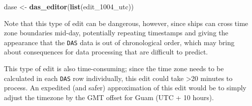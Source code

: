 \documentclass[
]{book}
\newenvironment{Shaded}{\begin{snugshade}}{\end{snugshade}}
\newcommand{\DecValTok}[1]{\textcolor[rgb]{0.00,0.00,0.81}{#1}}
\newcommand{\KeywordTok}[1]{\textcolor[rgb]{0.13,0.29,0.53}{\textbf{#1}}}
\newcommand{\NormalTok}[1]{#1}
\newcommand{\OperatorTok}[1]{\textcolor[rgb]{0.81,0.36,0.00}{\textbf{#1}}}
\newcommand{\StringTok}[1]{\textcolor[rgb]{0.31,0.60,0.02}{#1}}
\begin{document}
\begin{Shaded}
\begin{Highlighting}[]
\NormalTok{dase <-}\StringTok{ }\KeywordTok{das_editor}\NormalTok{(}\KeywordTok{list}\NormalTok{(edit_}\DecValTok{1004}\NormalTok{_utc))}
\end{Highlighting}
\end{Shaded}

\begin{Shaded}
\end{Shaded}

Note that this type of edit can be dangerous, however, since ships can cross time zone boundaries mid-day, potentially repeating timestamps and giving the appearance that the \texttt{DAS} data is out of chronological order, which may bring about consequences for data processing that are difficult to predict.

This type of edit is also time-consuming; since the time zone needs to be calculated in each \texttt{DAS} row individually, this edit could take \textgreater20 minutes to process. An expedited (and safer) approximation of this edit would be to simply adjust the timezone by the GMT offset for Guam (UTC + 10 hours).
\end{document}
